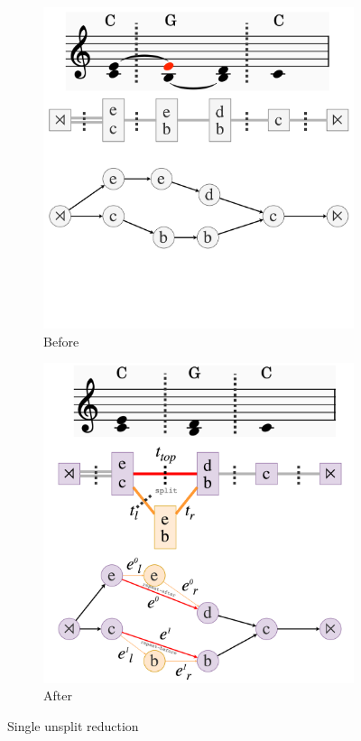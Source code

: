 \documentclass[12pt,a4paper,twoside,openany]{report} \usepackage[pdfborder={0 0 0}]{hyperref}    %
\theoremstyle{definition} \newtheorem{definition}{Definition}[section]
\begin{document}
  \begin{figure}[ht] \centering \begin{subfigure}[t]{.49\textwidth}
    \centering\includegraphics[keepaspectratio,width=\textwidth]{impl/reduction/before.png} \caption{Before}
    \label{fig:reductionBefore} \end{subfigure} \begin{subfigure}[t]{.49\textwidth}
    \centering\includegraphics[keepaspectratio,width=\textwidth]{impl/reduction/after.png} \caption{After}
    \label{fig:reductionAfter} \end{subfigure}

  \captionsetup{width=.9\linewidth} \caption{Single unsplit reduction} \label{fig:reductionStep} \end{figure} 
\end{document}
